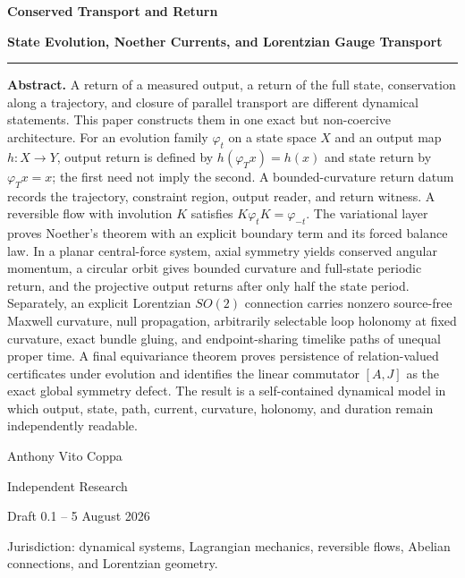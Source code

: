 \documentclass[11pt,letterpaper]{article}
\theoremstyle{dynamicsstyle}
\newcommand{\Flow}{\varphi}
\begin{document}
\hypersetup{pageanchor=false}

\begin{titlepage}
\thispagestyle{empty}
\vspace*{0.09\textheight}

{\fontsize{28}{33}\selectfont\bfseries\color{onyx} Conserved Transport and Return\par}
\vspace{0.75em}
{\fontsize{17}{22}\selectfont\bfseries State Evolution, Noether Currents, and Lorentzian Gauge Transport\par}

\vspace{2.0em}
\color{gold}\rule{0.62\textwidth}{1.1pt}\color{black}
\vspace{1.9em}

\begin{abstractbox}
\textbf{Abstract.}
A return of a measured output, a return of the full state, conservation along a trajectory, and closure of parallel transport are different dynamical statements.  This paper constructs them in one exact but non-coercive architecture.  For an evolution family $\Flow_t$ on a state space $X$ and an output map $h:X\to Y$, output return is defined by $h(\Flow_Tx)=h(x)$ and state return by $\Flow_Tx=x$; the first need not imply the second.  A bounded-curvature return datum records the trajectory, constraint region, output reader, and return witness.  A reversible flow with involution $K$ satisfies $K\Flow_tK=\Flow_{-t}$.  The variational layer proves Noether's theorem with an explicit boundary term and its forced balance law.  In a planar central-force system, axial symmetry yields conserved angular momentum, a circular orbit gives bounded curvature and full-state periodic return, and the projective output returns after only half the state period.  Separately, an explicit Lorentzian $SO(2)$ connection carries nonzero source-free Maxwell curvature, null propagation, arbitrarily selectable loop holonomy at fixed curvature, exact bundle gluing, and endpoint-sharing timelike paths of unequal proper time.  A final equivariance theorem proves persistence of relation-valued certificates under evolution and identifies the linear commutator $[A,J]$ as the exact global symmetry defect.  The result is a self-contained dynamical model in which output, state, path, current, curvature, holonomy, and duration remain independently readable.
\end{abstractbox}

\vfill
{\large Anthony Vito Coppa\par}
{\large Independent Research\par}
{\large Draft 0.1 -- 5 August 2026\par}
\vspace{0.6em}
{\small Jurisdiction: dynamical systems, Lagrangian mechanics, reversible flows, Abelian connections, and Lorentzian geometry.\par}
\end{titlepage}
\hypersetup{pageanchor=true}
\end{document}
